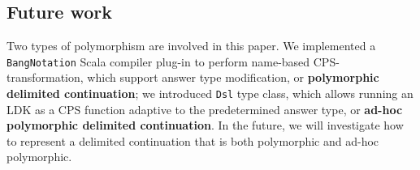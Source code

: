 \subsection{Future work}

Two types of polymorphism are involved in this paper. We implemented a \lstinline{BangNotation} Scala compiler plug-in to perform name-based CPS-transformation, which support answer type modification, or \textbf{polymorphic delimited continuation}; we introduced \lstinline{Dsl} type class, which allows running an LDK as a CPS function adaptive to the predetermined answer type, or \textbf{ad-hoc polymorphic delimited continuation}. In the future, we will investigate how to represent a delimited continuation that is both polymorphic and ad-hoc polymorphic.
